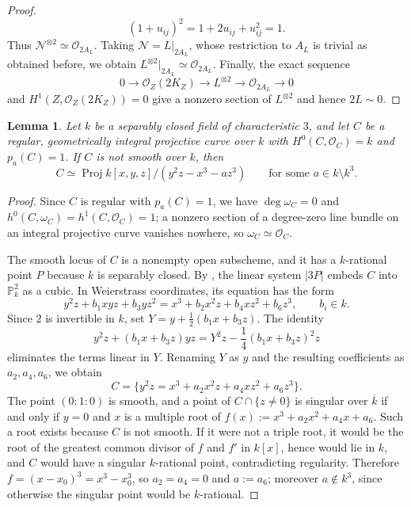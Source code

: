 \documentclass[10pt,abstract=true]{scrartcl}
\numberwithin{equation}{section}
\newtheorem{lemma}[theorem]{Lemma}
\theoremstyle{definition}
\theoremstyle{remark}
\DeclareMathOperator\Proj{Proj}
\begin{document}
\begin{proof}
  \[
    (1+u_{ij})^2 = 1+2u_{ij}+u_{ij}^2 = 1.
  \]
  Thus $\mathcal N^{\otimes2}\simeq\mathcal O_{2A_L}$.
  Taking $\mathcal N=L|_{2A_L}$, whose restriction to $A_L$ is trivial as obtained before, we obtain $L^{\otimes2}|_{2A_L}\simeq\mathcal O_{2A_L}$.
  Finally, the exact sequence
  \begin{equation}\label{eq:del-Pezzo-p2-double}
    0\longrightarrow\mathcal O_Z(2K_Z)
      \longrightarrow L^{\otimes2}
      \longrightarrow\mathcal O_{2A_L}\longrightarrow0
  \end{equation}
  and $H^1(Z,\mathcal O_Z(2K_Z))=0$ give a nonzero section of $L^{\otimes2}$ and hence $2 L \sim 0$.
\end{proof}

\begin{lemma}\label{lemm:genus-one-p3-forms}
  Let $k$ be a separably closed field of characteristic $3$, and let $C$ be a regular, geometrically integral projective curve over $k$ with $H^0(C,\mathcal O_C)=k$ and $p_a(C)=1$.
  If $C$ is not smooth over $k$, then
  \[
    C\simeq\Proj k[x,y,z]/(y^2z-x^3-az^3)
    \qquad\text{for some }a\in k\setminus k^3.
  \]
\end{lemma}
\begin{proof}
  Since $C$ is regular with $p_a(C)=1$, we have $\deg\omega_C=0$ and $h^0(C,\omega_C)=h^1(C,\mathcal O_C)=1$; a nonzero section of a degree-zero line bundle on an integral projective curve vanishes nowhere, so $\omega_C\simeq\mathcal O_C$.

  The smooth locus of $C$ is a nonempty open subscheme, and it has a $k$-rational point $P$ because $k$ is separably closed.
  By \cite[Corollary~11.12\textup{(1)}]{tanaka_invariants_2021}, the linear system $|3P|$ embeds $C$ into $\mathbb P^2_k$ as a cubic.
  In Weierstrass coordinates, its equation has the form
  \[
    y^2z+b_1xyz+b_3yz^2=x^3+b_2x^2z+b_4xz^2+b_6z^3,
    \qquad b_i\in k.
  \]
  Since $2$ is invertible in $k$, set $Y=y+\frac12(b_1x+b_3z)$.
  The identity
  \[
    y^2z+(b_1x+b_3z)yz
      =Y^2z-\frac14(b_1x+b_3z)^2z
  \]
  eliminates the terms linear in $Y$.
  Renaming $Y$ as $y$ and the resulting coefficients as $a_2,a_4,a_6$, we obtain
  \[
    C=\{y^2z=x^3+a_2x^2z+a_4xz^2+a_6z^3\} .
  \]
  The point $(0:1:0)$ is smooth, and a point of $C\cap\{z\neq0\}$ is singular over $\overline{k}$ if and only if $y=0$ and $x$ is a multiple root of $f(x):=x^3+a_2x^2+a_4x+a_6$.
  Such a root exists because $C$ is not smooth.
  If it were not a triple root, it would be the root of the greatest common divisor of $f$ and $f'$ in $k[x]$, hence would lie in $k$, and $C$ would have a singular $k$-rational point, contradicting regularity.
  Therefore $f=(x-x_0)^3=x^3-x_0^3$, so $a_2=a_4=0$ and $a:=a_6$; moreover $a\notin k^3$, since otherwise the singular point would be $k$-rational.
\end{proof}
\end{document}
